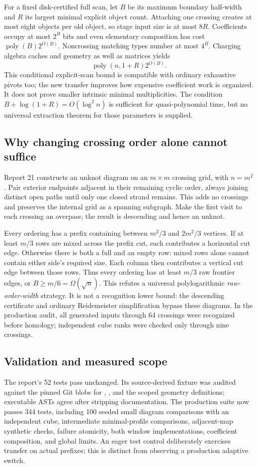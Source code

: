 For a fixed disk-certified full scan, let $B$ be its maximum boundary
half-width and $R$ its largest minimal explicit object count. Attaching one
crossing creates at most eight objects per old object, so stage input size
is at most $8R$. Coefficients occupy at most $2^B$ bits and even elementary
composition has cost $\operatorname{poly}(B)2^{O(B)}$. Noncrossing matching
types number at most $4^B$. Charging algebra caches and geometry as well as
matrices yields
\[
 \operatorname{poly}(n,1+R)2^{O(B)}.
\]
This conditional explicit-scan bound is compatible with ordinary exhaustive
pivots too; the new transfer improves how expensive coefficient work is
organized. It does not prove smaller intrinsic minimal multiplicities.
The condition $B+\log(1+R)=O(\log^2 n)$ is sufficient for quasi-polynomial
time, but no universal extraction theorem for those parameters is supplied.

\subsection{Why changing crossing order alone cannot suffice}
Report 21 constructs an unknot diagram on an $m\times m$ crossing grid,
with $n=m^2$. Pair exterior endpoints adjacent in their remaining cyclic
order, always joining distinct open paths until only one closed strand
remains. This adds no crossings and preserves the internal grid as a
spanning subgraph. Make the first visit to each crossing an overpass; the
result is descending and hence an unknot.

Every ordering has a prefix containing between $m^2/3$ and $2m^2/3$
vertices. If at least $m/3$ rows are mixed across the prefix cut, each
contributes a horizontal cut edge. Otherwise there is both a full and an
empty row: mixed rows alone cannot contain either side's required size.
Each column then contributes a vertical cut edge between those rows.
Thus every ordering has at least $m/3$ raw frontier edges, or
$B\ge m/6=\Omega(\sqrt n)$.
This refutes a universal polylogarithmic \emph{raw-order-width} strategy.
It is not a recognition lower bound: the descending certificate and ordinary
Reidemeister simplification bypass these diagrams. In the production audit,
all generated inputs through 64 crossings were recognized before homology;
independent cube ranks were checked only through nine crossings.

\subsection{Validation and measured scope}
The report's 52 tests pass unchanged. Its source-derived fixture was audited
against the pinned Git blobs for , , and
the scoped geometry definitions; executable ASTs agree after stripping
documentation. The production suite now passes 344 tests, including 100
seeded small diagram comparisons with an independent cube, intermediate
minimal-profile comparisons, adjacent-map synthetic checks, failure atomicity,
both window implementations, coefficient composition, and global limits.
An eager test control deliberately exercises transfer on actual prefixes;
this is distinct from observing a production adaptive switch.

